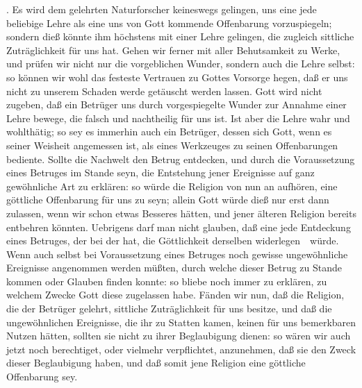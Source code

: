 . Es wird dem gelehrten Naturforscher keineswegs gelingen, uns eine jede beliebige Lehre als eine uns von Gott kommende Offenbarung vorzuspiegeln; sondern dieß könnte ihm höchstens mit einer Lehre gelingen, die zugleich sittliche Zuträglichkeit für uns hat. Gehen wir ferner mit aller Behutsamkeit zu Werke, und prüfen wir nicht nur die vorgeblichen Wunder, sondern auch die Lehre selbst: so können wir wohl das festeste Vertrauen zu Gottes Vorsorge hegen, daß er uns nicht zu unserem Schaden werde getäuscht werden lassen. Gott wird nicht zugeben, daß ein Betrüger uns durch vorgespiegelte Wunder zur Annahme einer Lehre bewege, die falsch und nachtheilig für uns ist. Ist aber die Lehre wahr und wohlthätig; so sey es immerhin auch ein Betrüger, dessen sich Gott, wenn es seiner Weisheit angemessen ist, als eines Werkzeuges zu seinen Offenbarungen bediente. Sollte die Nachwelt den Betrug entdecken, und durch die Voraussetzung eines Betruges im Stande seyn, die Entstehung jener Ereignisse auf ganz gewöhnliche Art zu erklären: so würde die Religion von nun an aufhören, eine göttliche Offenbarung für uns zu seyn; allein Gott würde dieß nur erst dann zulassen, wenn wir schon etwas Besseres hätten, und jener älteren Religion bereits entbehren könnten. Uebrigens darf man nicht glauben, daß eine jede Entdeckung eines Betruges, der bei der  hat, die Göttlichkeit derselben widerlegen~\ würde. Wenn auch selbst bei Voraussetzung eines Betruges noch gewisse ungewöhnliche Ereignisse angenommen werden müßten, durch welche dieser Betrug zu Stande kommen oder Glauben finden konnte: so bliebe noch immer zu erklären, zu welchem Zwecke Gott diese zugelassen habe. Fänden wir nun, daß die Religion, die der Betrüger gelehrt, sittliche Zuträglichkeit für uns besitze, und daß die ungewöhnlichen Ereignisse, die ihr zu Statten kamen, keinen für uns bemerkbaren Nutzen hätten, sollten sie nicht zu ihrer Beglaubigung dienen: so wären wir auch jetzt noch berechtiget, oder vielmehr verpflichtet, anzunehmen, daß sie den Zweck dieser Beglaubigung haben, und daß somit jene Religion eine göttliche Offenbarung sey.
   
